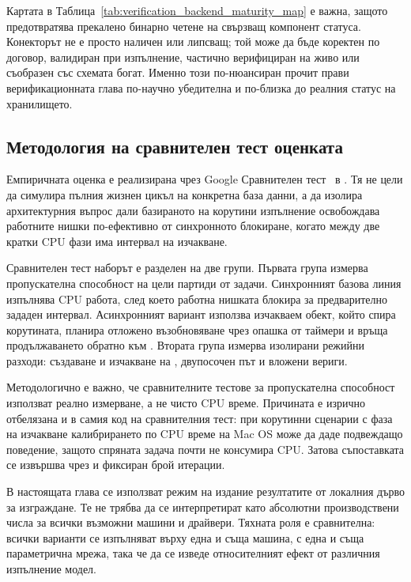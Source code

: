 Картата в Таблица~\ref{tab:verification_backend_maturity_map} е важна, защото предотвратява прекалено бинарно четене на свързващ компонент статуса. Конекторът не е просто наличен или липсващ; той може да бъде коректен по договор, валидиран при изпълнение, частично верифициран на живо или съобразен със схемата богат. Именно този по-нюансиран прочит прави верификационната глава по-научно убедителна и по-близка до реалния статус на хранилището.

\subsection{Методология на сравнителен тест оценката}

Емпиричната оценка е реализирана чрез Google Сравнителен тест~\cite{google_benchmark_user_guide} в . Тя не цели да симулира пълния жизнен цикъл на конкретна база данни, а да изолира архитектурния въпрос дали базираното на корутини изпълнение освобождава работните нишки по-ефективно от синхронното блокиране, когато между две кратки CPU фази има интервал на изчакване.

Сравнителен тест наборът е разделен на две групи. Първата група измерва пропускателна способност на цели партиди от задачи. Синхронният базова линия изпълнява CPU работа, след което работна нишката блокира за предварително зададен интервал. Асинхронният вариант използва  изчакваем обект, който спира корутината, планира отложено възобновяване чрез опашка от таймери и връща продължаването обратно към . Втората група измерва изолирани режийни разходи: създаване и изчакване на ,  двупосочен път и вложени  вериги.

Методологично е важно, че сравнителните тестове за пропускателна способност използват реално измерване, а не чисто CPU време. Причината е изрично отбелязана и в самия код на сравнителния тест: при корутинни сценарии с фаза на изчакване калибрирането по CPU време на Mac OS може да даде подвеждащо поведение, защото спряната задача почти не консумира CPU. Затова съпоставката се извършва чрез  и фиксиран брой итерации.

В настоящата глава се използват режим на издание резултатите от локалния  дърво за изграждане. Те не трябва да се интерпретират като абсолютни производствени числа за всички възможни машини и драйвери. Тяхната роля е сравнителна: всички варианти се изпълняват върху една и съща машина, с една и съща параметрична мрежа, така че да се изведе относителният ефект от различния изпълнение модел.

